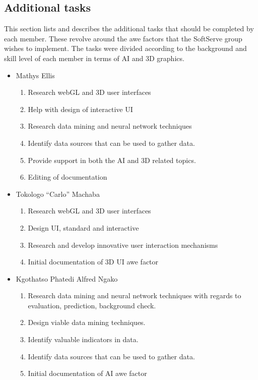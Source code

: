 \documentclass[12pt]{article}
\begin{document}
\subsection{Additional tasks}
This section lists and describes the additional tasks that should be completed by each member. These revolve around the awe factors that the SoftServe group wishes to implement. The tasks were divided according to the background and skill level of each member in terms of AI and 3D graphics. 
\begin{itemize}
	\item Mathys Ellis
	\begin{enumerate}
		\item Research webGL and 3D user interfaces
		\item Help with design of interactive UI
		\item Research data mining and neural network techniques
		\item Identify data sources that can be used to gather data.
		\item Provide support in both the AI and 3D related topics.
		\item Editing of documentation
	\end{enumerate}
	\item Tokologo “Carlo” Machaba
	\begin{enumerate}
		\item Research webGL and 3D user interfaces
		\item Design UI, standard and interactive
		\item Research and develop innovative user interaction mechanisms
		\item Initial documentation of 3D UI awe factor
	\end{enumerate}
	\item Kgothatso Phatedi Alfred Ngako
	\begin{enumerate}
		\item Research data mining and neural network techniques with regards to evaluation, prediction, background check.
		\item Design viable data mining techniques.
		\item Identify valuable indicators in data.
		\item Identify data sources that can be used to gather data.
		\item Initial documentation of AI awe factor
	\end{enumerate}
\end{itemize}
\end{document}
